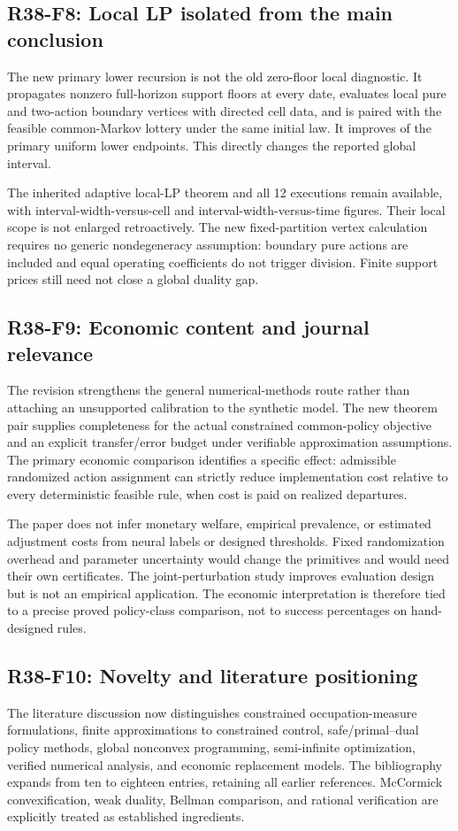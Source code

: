 \subsection{R38-F8: Local LP isolated from the main conclusion}
The new primary lower recursion is not the old zero-floor local diagnostic. It propagates nonzero full-horizon support floors at every date, evaluates local pure and two-action boundary vertices with directed cell data, and is paired with the feasible common-Markov lottery under the same initial law. It improves \LocalImproveCount{} of the primary uniform lower endpoints. This directly changes the reported global interval.

The inherited adaptive local-LP theorem and all 12 executions remain available, with interval-width-versus-cell and interval-width-versus-time figures. Their local scope is not enlarged retroactively. The new fixed-partition vertex calculation requires no generic nondegeneracy assumption: boundary pure actions are included and equal operating coefficients do not trigger division. Finite support prices still need not close a global duality gap.

\subsection{R38-F9: Economic content and journal relevance}
The revision strengthens the general numerical-methods route rather than attaching an unsupported calibration to the synthetic model. The new theorem pair supplies completeness for the actual constrained common-policy objective and an explicit transfer/error budget under verifiable approximation assumptions. The primary economic comparison identifies a specific effect: admissible randomized action assignment can strictly reduce implementation cost relative to every deterministic feasible rule, when cost is paid on realized departures.

The paper does not infer monetary welfare, empirical prevalence, or estimated adjustment costs from neural labels or designed thresholds. Fixed randomization overhead and parameter uncertainty would change the primitives and would need their own certificates. The joint-perturbation study improves evaluation design but is not an empirical application. The economic interpretation is therefore tied to a precise proved policy-class comparison, not to success percentages on hand-designed rules.

\subsection{R38-F10: Novelty and literature positioning}
The literature discussion now distinguishes constrained occupation-measure formulations, finite approximations to constrained control, safe/primal--dual policy methods, global nonconvex programming, semi-infinite optimization, verified numerical analysis, and economic replacement models. The bibliography expands from ten to eighteen entries, retaining all earlier references. McCormick convexification, weak duality, Bellman comparison, and rational verification are explicitly treated as established ingredients.

